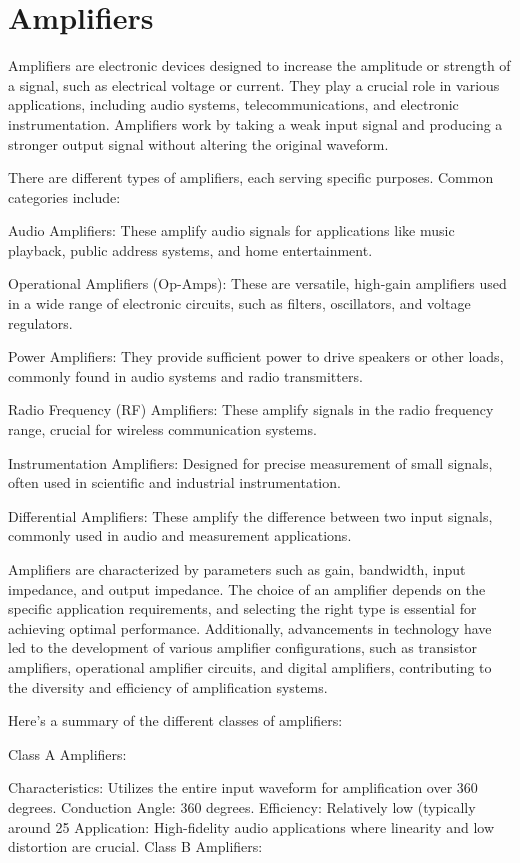 \chapter{Amplifiers}
Amplifiers are electronic devices designed to increase the amplitude or strength of a signal, such as electrical voltage or current. They play a crucial role in various applications, including audio systems, telecommunications, and electronic instrumentation. Amplifiers work by taking a weak input signal and producing a stronger output signal without altering the original waveform.

There are different types of amplifiers, each serving specific purposes. Common categories include:

Audio Amplifiers: These amplify audio signals for applications like music playback, public address systems, and home entertainment.

Operational Amplifiers (Op-Amps): These are versatile, high-gain amplifiers used in a wide range of electronic circuits, such as filters, oscillators, and voltage regulators.

Power Amplifiers: They provide sufficient power to drive speakers or other loads, commonly found in audio systems and radio transmitters.

Radio Frequency (RF) Amplifiers: These amplify signals in the radio frequency range, crucial for wireless communication systems.

Instrumentation Amplifiers: Designed for precise measurement of small signals, often used in scientific and industrial instrumentation.

Differential Amplifiers: These amplify the difference between two input signals, commonly used in audio and measurement applications.

Amplifiers are characterized by parameters such as gain, bandwidth, input impedance, and output impedance. The choice of an amplifier depends on the specific application requirements, and selecting the right type is essential for achieving optimal performance. Additionally, advancements in technology have led to the development of various amplifier configurations, such as transistor amplifiers, operational amplifier circuits, and digital amplifiers, contributing to the diversity and efficiency of amplification systems.

Here's a summary of the different classes of amplifiers:

Class A Amplifiers:

Characteristics: Utilizes the entire input waveform for amplification over 360 degrees.
Conduction Angle: 360 degrees.
Efficiency: Relatively low (typically around 25%
Application: High-fidelity audio applications where linearity and low distortion are crucial.
Class B Amplifiers:

